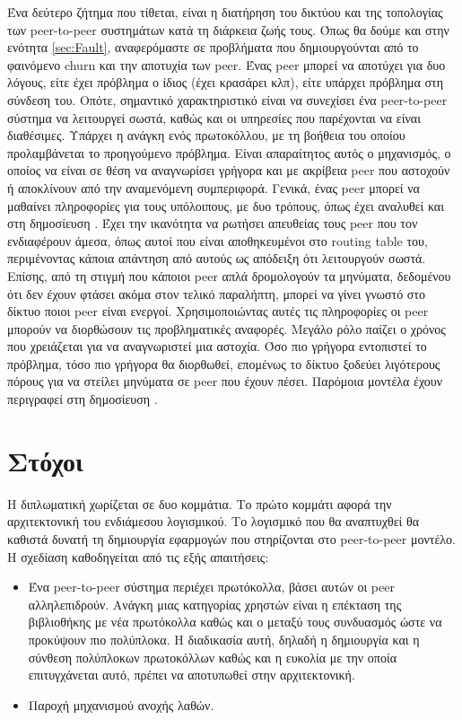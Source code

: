 Ένα δεύτερο ζήτημα που τίθεται, είναι η διατήρηση του δικτύου και της 
τοπολογίας των peer-to-peer συστημάτων κατά τη διάρκεια ζωής τους. Όπως 
θα δούμε και στην ενότητα \ref{sec:Fault}, αναφερόμαστε σε προβλήματα που 
δημιουργούνται από το φαινόμενο churn και την αποτυχία των peer. Ένας 
peer μπορεί να αποτύχει για δυο λόγους, είτε έχει πρόβλημα ο ίδιος (έχει 
κρασάρει κλπ), είτε υπάρχει πρόβλημα στη σύνδεση του. Οπότε, σημαντικό 
χαρακτηριστικό είναι να συνεχίσει ένα peer-to-peer σύστημα να λειτουργεί 
σωστά, καθώς και οι υπηρεσίες που παρέχονται να είναι διαθέσιμες. Υπάρχει 
η ανάγκη ενός πρωτοκόλλου, με τη βοήθεια του οποίου προλαμβάνεται το προηγούμενο 
πρόβλημα. Είναι απαραίτητος αυτός ο μηχανισμός, 
ο οποίος να είναι σε θέση να αναγνωρίσει 
γρήγορα και με ακρίβεια peer που αστοχούν ή αποκλίνουν από την 
αναμενόμενη συμπεριφορά. Γενικά, ένας peer μπορεί να μαθαίνει 
πληροφορίες για τους υπόλοιπους, με δυο τρόπους, όπως έχει αναλυθεί και 
στη δημοσίευση \citep{Stoica2005}. Έχει την ικανότητα να ρωτήσει απευθείας 
τους peer που τον ενδιαφέρουν άμεσα, όπως αυτοί που είναι αποθηκευμένοι στο 
routing table του, περιμένοντας κάποια απάντηση από αυτούς ως απόδειξη 
ότι λειτουργούν σωστά. Επίσης, από τη στιγμή που κάποιοι peer απλά 
δρομολογούν τα μηνύματα, δεδομένου ότι δεν έχουν φτάσει ακόμα στον 
τελικό παραλήπτη, μπορεί να γίνει γνωστό στο δίκτυο ποιοι peer είναι 
ενεργοί. Χρησιμοποιώντας αυτές τις πληροφορίες οι peer μπορούν να 
διορθώσουν τις προβληματικές αναφορές. Μεγάλο ρόλο παίζει ο χρόνος που 
χρειάζεται για να αναγνωριστεί μια αστοχία. Όσο πιο γρήγορα εντοπιστεί 
το πρόβλημα, τόσο πιο γρήγορα θα διορθωθεί, επομένως το δίκτυο ξοδεύει 
λιγότερους πόρους για να στείλει μηνύματα σε peer που έχουν πέσει. 
Παρόμοια μοντέλα έχουν περιγραφεί στη δημοσίευση \citep{Rodrigues2002}.

\section{Στόχοι}

Η διπλωματική χωρίζεται σε δυο κομμάτια. Το πρώτο κομμάτι αφορά την 
αρχιτεκτονική του ενδιάμεσου λογισμικού. Το λογισμικό που θα αναπτυχθεί 
θα καθιστά δυνατή τη δημιουργία εφαρμογών που στηρίζονται στο peer-to-peer 
μοντέλο. Η σχεδίαση καθοδηγείται από τις εξής απαιτήσεις:

\begin{itemize}
\item Ένα peer-to-peer σύστημα περιέχει πρωτόκολλα, βάσει αυτών οι peer 
αλληλεπιδρούν. Ανάγκη μιας κατηγορίας χρηστών είναι η επέκταση της 
βιβλιοθήκης με νέα πρωτόκολλα καθώς και ο μεταξύ τους συνδυασμός ώστε να 
προκύψουν πιο πολύπλοκα. Η διαδικασία αυτή, δηλαδή η δημιουργία και η 
σύνθεση πολύπλοκων πρωτοκόλλων καθώς και η ευκολία με την οποία 
επιτυγχάνεται αυτό, πρέπει να αποτυπωθεί στην αρχιτεκτονική.
\item Παροχή μηχανισμού ανοχής λαθών.
\end{itemize}


